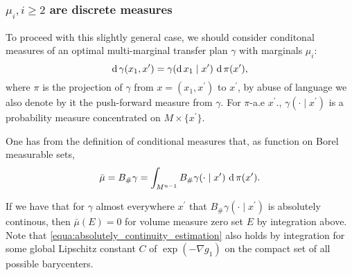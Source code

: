 \subsubsection{$\mu_i, i \geq 2$ are discrete measures}
To proceed with this slightly general case,
we should consider conditonal measures of an optimal multi-marginal transfer plan $\gamma$
with marginals $\mu_i$:
\[
	\operatorname{d} \gamma(x_1, x^\prime)= \gamma(\operatorname{d} x_1 \mid x^\prime)\, \operatorname{d} \pi(x^\prime) ,
\]
where $\pi$ is the projection of $\gamma$ from $x = (x_1, x^\prime)$ to $x^\prime$,
by abuse of language we also denote by it the push-forward measure from $\gamma$.
For $\pi$-a.e $x^\prime$., $\gamma(\cdot \mid x^\prime)$ is a probability measure
concentrated on $M \times \{x^\prime\}$.

One has from the definition of conditional measures that,
as function on Borel measurable sets,
\[
	\bar{\mu} = B_{\#} \gamma = \int_{M^{n-1}} B_{\#} \gamma(\cdot \mid x^\prime)\, \operatorname{d} \pi(x^\prime).
\]

If we have that for $\gamma$ almost everywhere $x^\prime$ that
$B_{\#} \gamma(\cdot \mid x^\prime)$
is absolutely continous,
then $\bar{\mu}(E)=0$ for volume measure zero set $E$ by integration above.
Note that \cref{equa:absolutely_continuity_estimation} also holds by integration
for some global Lipschitz constant $C$ of $\exp( - \nabla g_1)$ on the compact set of all possible barycenters.

